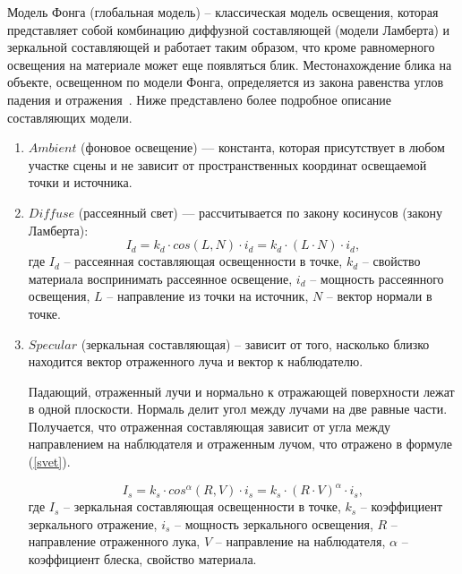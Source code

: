 Модель Фонга (глобальная модель) – классическая модель освещения, которая представляет собой комбинацию диффузной составляющей (модели Ламберта) и зеркальной составляющей и работает таким образом, что кроме равномерного освещения на материале может еще появляться блик. Местонахождение блика на объекте, освещенном по модели Фонга, определяется из закона равенства углов падения и отражения~\cite{Kurov}.
Ниже представлено более подробное описание составляющих модели.
\begin{enumerate}
	\item $Ambient$ (фоновое освещение) --- константа, которая присутствует в любом участке сцены и не зависит от пространственных координат освещаемой точки и источника.
	\item $Diffuse$ (рассеянный свет) --- рассчитывается по закону косинусов (закону Ламберта):
	\begin{equation}
		\label{svet_a}
		I_d = k_d\cdot cos(L, N)\cdot i_d = k_d\cdot(L\cdot N)\cdot i_d,
	\end{equation}
	где $I_d$ -- рассеянная составляющая освещенности в точке, $k_d$ -- свойство материала воспринимать рассеянное освещение, $i_d$ -- мощность рассеянного освещения, $L$ -- направление из точки на источник, $N$ -- вектор нормали в точке.
	\item $Specular$ (зеркальная составляющая) -- зависит от того, насколько близко находится вектор отраженного луча и вектор к наблюдателю.
	
	Падающий, отраженный лучи и нормально к отражающей поверхности лежат в одной плоскости. Нормаль делит угол между лучами на две равные части. Получается, что отраженная составляющая зависит от угла между направлением на наблюдателя и отраженным лучом, что отражено в формуле (\ref{svet}).
	
	\begin{equation}
		\label{svet}
		I_s = k_s\cdot cos^{\alpha}(R, V)\cdot i_s = k_s\cdot(R\cdot V)^{\alpha}\cdot i_s,
	\end{equation}
	где $I_s$ -- зеркальная составляющая освещенности в точке, $k_s$ -- коэффициент зеркального отражение, $i_s$ -- мощность зеркального освещения, $R$ -- направление отраженного лука, $V$ -- направление на наблюдателя, $\alpha$ -- коэффициент блеска, свойство материала.
\end{enumerate}

